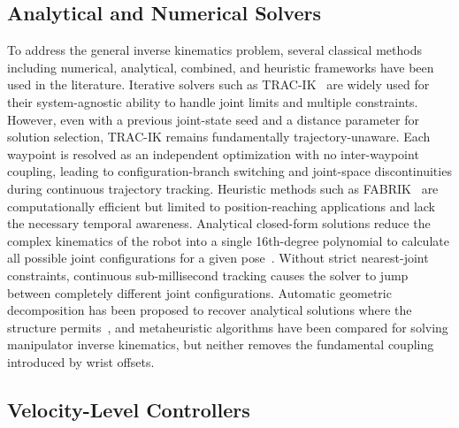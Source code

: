 \subsection{Analytical and Numerical Solvers}\label{subsec:lit_analytical}

To address the general inverse kinematics problem, several classical methods including numerical,
analytical, combined, and heuristic frameworks have been used in the literature. Iterative solvers
such as TRAC-IK~\citep{beeson2015trac} are widely used for their system-agnostic ability to handle
joint limits and multiple constraints. However, even with a previous joint-state seed and a distance
parameter for solution selection, TRAC-IK remains fundamentally trajectory-unaware. Each waypoint is
resolved as an independent optimization with no inter-waypoint coupling, leading to
configuration-branch switching and joint-space discontinuities during continuous trajectory
tracking. Heuristic methods such as FABRIK~\citep{aristidou2011fabrik} are computationally efficient but limited to position-reaching applications and lack the necessary temporal awareness. Analytical closed-form solutions reduce the complex kinematics of the robot into a single 16th-degree polynomial to calculate all possible joint configurations for a given pose~\citep{zohour2021kinova}. Without strict nearest-joint constraints, continuous sub-millisecond
tracking causes the solver to jump between completely different joint configurations. Automatic geometric decomposition has been proposed to recover analytical solutions where the structure permits~\citep{ostermeier2025automatic}, and metaheuristic algorithms have been compared for solving manipulator inverse kinematics, but neither removes the fundamental coupling introduced by wrist offsets.

\subsection{Velocity-Level Controllers}\label{subsec:lit_velocity}

